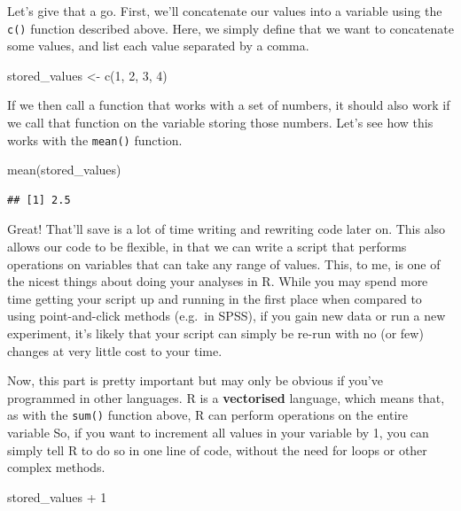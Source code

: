 \documentclass[
]{book}
\newenvironment{Shaded}{\begin{snugshade}}{\end{snugshade}}
\newcommand{\DecValTok}[1]{\textcolor[rgb]{0.00,0.00,0.81}{#1}}
\newcommand{\FunctionTok}[1]{\textcolor[rgb]{0.00,0.00,0.00}{#1}}
\newcommand{\NormalTok}[1]{#1}
\newcommand{\OtherTok}[1]{\textcolor[rgb]{0.56,0.35,0.01}{#1}}
\newcommand{\SpecialCharTok}[1]{\textcolor[rgb]{0.00,0.00,0.00}{#1}}
\begin{document}
Let's give that a go. First, we'll concatenate our values into a variable using the \texttt{c()} function described above. Here, we simply define that we want to concatenate some values, and list each value separated by a comma.

\begin{Shaded}
\begin{Highlighting}[]
\NormalTok{stored\_values }\OtherTok{\textless{}{-}} \FunctionTok{c}\NormalTok{(}\DecValTok{1}\NormalTok{, }\DecValTok{2}\NormalTok{, }\DecValTok{3}\NormalTok{, }\DecValTok{4}\NormalTok{)}
\end{Highlighting}
\end{Shaded}

If we then call a function that works with a set of numbers, it should also work if we call that function on the variable storing those numbers. Let's see how this works with the \texttt{mean()} function.

\begin{Shaded}
\begin{Highlighting}[]
\FunctionTok{mean}\NormalTok{(stored\_values)}
\end{Highlighting}
\end{Shaded}

\begin{verbatim}
## [1] 2.5
\end{verbatim}

Great! That'll save is a lot of time writing and rewriting code later on. This also allows our code to be flexible, in that we can write a script that performs operations on variables that can take any range of values. This, to me, is one of the nicest things about doing your analyses in R. While you may spend more time getting your script up and running in the first place when compared to using point-and-click methods (e.g.~in SPSS), if you gain new data or run a new experiment, it's likely that your script can simply be re-run with no (or few) changes at very little cost to your time.

Now, this part is pretty important but may only be obvious if you've programmed in other languages. R is a \textbf{vectorised} language, which means that, as with the \texttt{sum()} function above, R can perform operations on the entire variable So, if you want to increment all values in your variable by 1, you can simply tell R to do so in one line of code, without the need for loops or other complex methods.

\begin{Shaded}
\begin{Highlighting}[]
\NormalTok{stored\_values }\SpecialCharTok{+} \DecValTok{1}
\end{Highlighting}
\end{Shaded}
\end{document}

